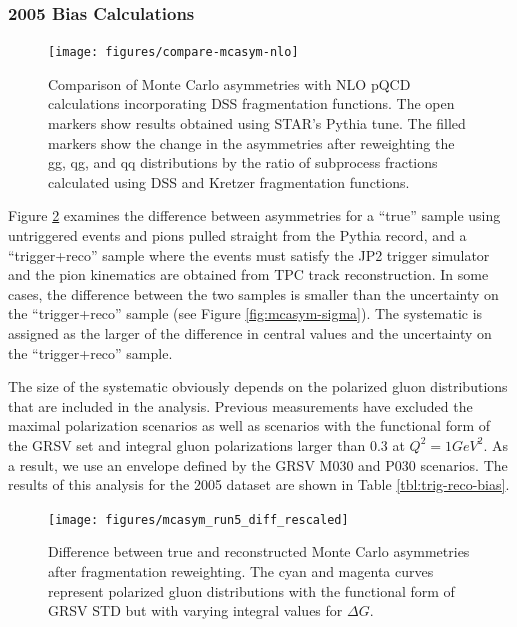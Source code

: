 \subsubsection{2005 Bias Calculations}

\begin{figure}
  \texttt{[image: figures/compare-mcasym-nlo]}
  \caption{Comparison of Monte Carlo asymmetries with NLO pQCD calculations
  incorporating DSS fragmentation functions. The open markers show results
  obtained using STAR's Pythia tune. The filled markers show the change in the
  asymmetries after reweighting the gg, qg, and qq distributions by the ratio
  of subprocess fractions calculated using DSS and Kretzer fragmentation
  functions.}
  \label{fig:compare-mcasym-nlo}
\end{figure}

Figure \ref{fig:mcasym-diff} examines the difference between asymmetries for a
``true'' sample using untriggered events and pions pulled straight from the
Pythia record, and a ``trigger+reco'' sample where the events must satisfy the
JP2 trigger simulator and the pion kinematics are obtained from TPC track
reconstruction. In some cases, the difference between the two samples is smaller
than the uncertainty on the ``trigger+reco'' sample (see Figure
\ref{fig:mcasym-sigma}). The systematic is assigned as the larger of the
difference in central values and the uncertainty on the ``trigger+reco'' sample.

The size of the systematic obviously depends on the polarized gluon
distributions that are included in the analysis. Previous measurements have
excluded the maximal polarization scenarios as well as scenarios with the
functional form of the GRSV set and integral gluon polarizations larger than 0.3
at \(Q^2 = 1 GeV^2\). As a result, we use an envelope defined by the GRSV M030
and P030 scenarios. The results of this analysis for the 2005 dataset are shown
in Table \ref{tbl:trig-reco-bias}.


\begin{figure}
  \texttt{[image: figures/mcasym\_run5\_diff\_rescaled]}
  \caption{Difference between true and reconstructed Monte Carlo
  asymmetries after fragmentation reweighting.  The cyan and magenta curves represent polarized gluon distributions with the functional form of GRSV STD but with varying integral values for $\Delta G$.}
  \label{fig:mcasym-diff}
\end{figure}

